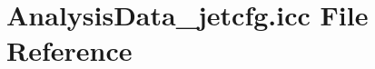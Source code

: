 \hypertarget{AnalysisData__jetcfg_8icc}{}\section{Analysis\+Data\+\_\+jetcfg.\+icc File Reference}
\label{AnalysisData__jetcfg_8icc}
